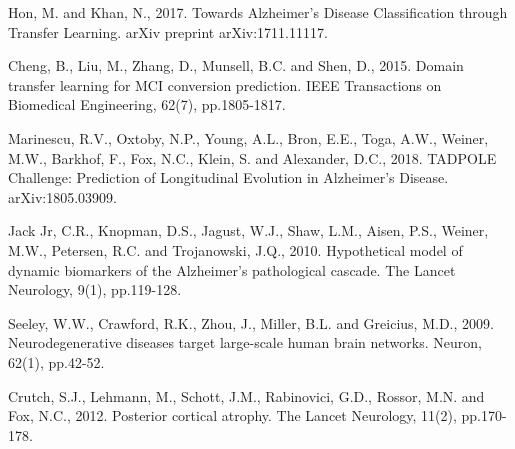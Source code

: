 \documentclass{llncs}
\begin{document}
\begin{thebibliography}{5}
Hon, M. and Khan, N., 2017. Towards Alzheimer's Disease Classification through Transfer Learning. arXiv preprint arXiv:1711.11117.


Cheng, B., Liu, M., Zhang, D., Munsell, B.C. and Shen, D., 2015. Domain transfer learning for MCI conversion prediction. IEEE Transactions on Biomedical Engineering, 62(7), pp.1805-1817.

Marinescu, R.V., Oxtoby, N.P., Young, A.L., Bron, E.E., Toga, A.W., Weiner, M.W., Barkhof, F., Fox, N.C., Klein, S. and Alexander, D.C., 2018. TADPOLE Challenge: Prediction of Longitudinal Evolution in Alzheimer's Disease. arXiv:1805.03909.

Jack Jr, C.R., Knopman, D.S., Jagust, W.J., Shaw, L.M., Aisen, P.S., Weiner, M.W., Petersen, R.C. and Trojanowski, J.Q., 2010. Hypothetical model of dynamic biomarkers of the Alzheimer's pathological cascade. The Lancet Neurology, 9(1), pp.119-128.

Seeley, W.W., Crawford, R.K., Zhou, J., Miller, B.L. and Greicius, M.D., 2009. Neurodegenerative diseases target large-scale human brain networks. Neuron, 62(1), pp.42-52.




Crutch, S.J., Lehmann, M., Schott, J.M., Rabinovici, G.D., Rossor, M.N. and Fox, N.C., 2012. Posterior cortical atrophy. The Lancet Neurology, 11(2), pp.170-178.


\end{thebibliography}

\clearpage
\end{document}
